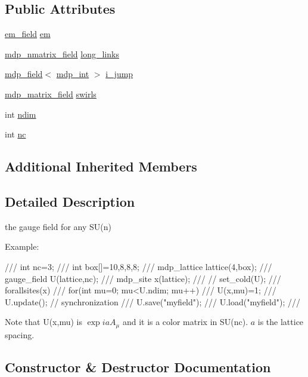 \subsection*{Public Attributes}
\begin{DoxyCompactItemize}
\item 
\hyperlink{classem__field}{em\+\_\+field} \hyperlink{classgauge__field_a8e12cc66b84dc51a33e0a942cc7c3f5c}{em}
\item 
\hyperlink{classmdp__nmatrix__field}{mdp\+\_\+nmatrix\+\_\+field} \hyperlink{classgauge__field_a2371b7cec512a57c18ba34269a5ba95a}{long\+\_\+links}
\item 
\hyperlink{classmdp__field}{mdp\+\_\+field}$<$ \hyperlink{mdp__global__vars_8h_aaa1ad9d0dcd2124aa5af0120d9954174}{mdp\+\_\+int} $>$ \hyperlink{classgauge__field_a3914ca4c0b33e495a2c1d34f158d6ce2}{i\+\_\+jump}
\item 
\hyperlink{classmdp__matrix__field}{mdp\+\_\+matrix\+\_\+field} \hyperlink{classgauge__field_a8b62d947d9237b33c554f3490cd62335}{swirls}
\item 
int \hyperlink{classgauge__field_a6be2d71c62063374567046e00cfb0983}{ndim}
\item 
int \hyperlink{classgauge__field_ada7f51e4041a64c45f484fc0a734a464}{nc}
\end{DoxyCompactItemize}
\subsection*{Additional Inherited Members}


\subsection{Detailed Description}
the gauge field for any S\+U(n) 

Example\+: \begin{DoxyVerb}///    int nc=3; 
///    int box[]={10,8,8,8};
///    mdp_lattice lattice(4,box);
///    gauge_field U(lattice,nc);
///    mdp_site x(lattice);
///    // set_cold(U);
///    forallsites(x)
///       for(int mu=0; mu<U.ndim; mu++)
///          U(x,mu)=1;
///    U.update(); // synchronization
///    U.save("myfield");
///    U.load("myfield");
/// \end{DoxyVerb}
 Note that U(x,mu) is $ \exp{iaA_{\mu}} $ and it is a color matrix in S\+U(nc). $a$ is the lattice spacing. 

\subsection{Constructor \& Destructor Documentation}
\mbox{\label{classgauge__field_abdb50dfc413d1c22904a0ea38fc72e34}} 
